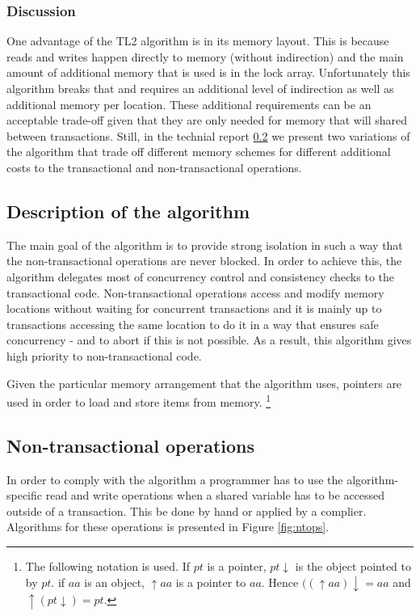 \documentclass[11pt,letterpaper]{article}
\begin{document}
\subsubsection{Discussion}
One advantage of the TL2 algorithm is in its memory layout.
This is because reads and writes happen directly to memory (without indirection)
and the main amount of additional memory that is used is in the lock array.
Unfortunately this algorithm breaks that and requires an additional level of indirection
as well as additional memory per location.
These additional requirements can be an acceptable trade-off given that they are only
needed for memory that will shared between transactions.
Still, in the technial report \ref{} we present two variations of the algorithm that trade
off different memory schemes for different additional costs to the transactional and
non-transactional operations.


\subsection{Description of the algorithm}

The main goal of the algorithm is to provide strong isolation 
in such a way that  the non-transactional  operations are never blocked. 
In order  to achieve this,  the algorithm delegates most of  
concurrency   control   and  consistency   checks   to  the   transactional
code. Non-transactional  
operations access and modify  memory  locations without waiting for concurrent transactions
 and it is mainly up to transactions accessing the same location to
do it in a way that ensures safe  
concurrency - and to abort if this  is not possible.  As a
result, this algorithm gives high  priority   to non-transactional code. 

Given the particular memory arrangement  that the algorithm uses,
pointers are used in order to load and store items from memory.
\footnote{The following  notation  is
used. If $pt$ is a pointer, $pt\downarrow$ is the object pointed to by $pt$. 
if $aa$ is an object, $\uparrow aa$ is a pointer to $aa$. Hence 
$((\uparrow aa)\downarrow =aa$ and $ \uparrow(pt \downarrow)=pt$.}



\subsection{Non-transactional operations}
In  order  to  comply  with  the  algorithm a  programmer  has  to  use  the
algorithm-specific   read  and write  operations when a shared variable has  to be
accessed outside of a transaction.  This be done by hand or applied by a complier.
Algorithms for these operations is presented in Figure \ref{fig:ntops}. 
\end{document}
